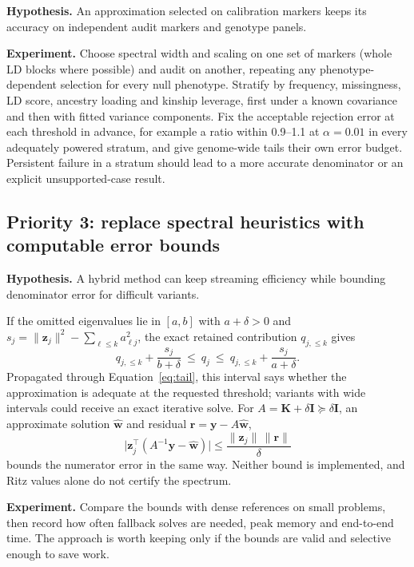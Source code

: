 \documentclass[11pt]{article}
\newcommand{\y}{\mathbf{y}}
\newcommand{\z}{\mathbf{z}}
\newcommand{\w}{\mathbf{w}}
\newcommand{\K}{\mathbf{K}}
\newcommand{\I}{\mathbf{I}}
\begin{document}
\textbf{Hypothesis.} An approximation selected on calibration markers
keeps its accuracy on independent audit markers and genotype panels.

\textbf{Experiment.} Choose spectral width and scaling on one set of
markers (whole LD blocks where possible) and audit on another, repeating
any phenotype-dependent selection for every null phenotype. Stratify by
frequency, missingness, LD score, ancestry loading and kinship leverage,
first under a known covariance and then with fitted variance components.
Fix the acceptable rejection error at each threshold in advance, for
example a ratio within 0.9--1.1 at $\alpha=0.01$ in every adequately
powered stratum, and give genome-wide tails their own error budget.
Persistent failure in a stratum should lead to a more accurate
denominator or an explicit unsupported-case result.

\subsection{Priority 3: replace spectral heuristics with computable error bounds}

\textbf{Hypothesis.} A hybrid method can keep streaming efficiency while
bounding denominator error for difficult variants.

If the omitted eigenvalues lie in $[a,b]$ with $a+\delta>0$ and
$s_j=\|\z_j\|^2-\sum_{\ell\leq k}a_{\ell j}^2$, the exact retained
contribution $q_{j,\leq k}$ gives
\begin{equation}
 q_{j,\leq k}+\frac{s_j}{b+\delta}
 \ \leq\ q_j\ \leq\
 q_{j,\leq k}+\frac{s_j}{a+\delta}.
 \label{eq:tailbound}
\end{equation}
Propagated through Equation~\eqref{eq:tail}, this interval says whether
the approximation is adequate at the requested threshold; variants with
wide intervals could receive an exact iterative solve. For
$A=\K+\delta\I\succeq\delta\I$, an approximate solution $\widehat{\w}$ and
residual $\mathbf r=\y-A\widehat{\w}$,
\begin{equation}
 \big|\z_j^\top(A^{-1}\y-\widehat{\w})\big|
 \leq \frac{\|\z_j\|\,\|\mathbf r\|}{\delta}
 \label{eq:cgbound}
\end{equation}
bounds the numerator error in the same way. Neither bound is implemented,
and Ritz values alone do not certify the spectrum.

\textbf{Experiment.} Compare the bounds with dense references on small
problems, then record how often fallback solves are needed, peak memory
and end-to-end time. The approach is worth keeping only if the bounds are
valid and selective enough to save work.
\end{document}
